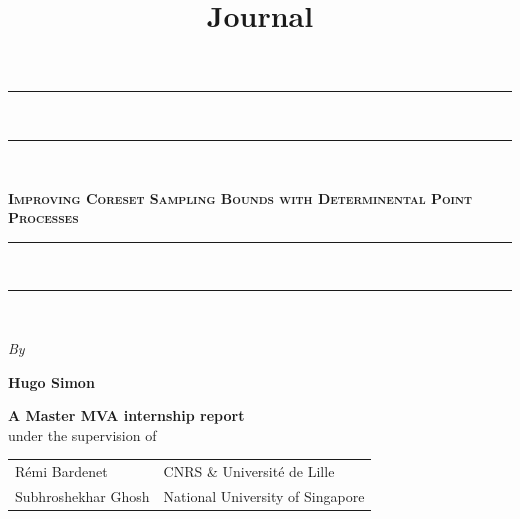 \documentclass{report} %
\title{Journal}
\newcommand{\1}{\mathds{1}} %
\theoremstyle{definition} %
\begin{document}
\begin{titlepage}
    \begin{center}
        \vspace*{25pt} {
        \begin{spacing}{0.05}
            \rule{400pt}{2pt}\\
            \rule{400pt}{0.75pt}\\
        \end{spacing}
        \vspace{20pt}
        \begin{spacing}{0.9}
            \fontsize{26pt}{26pt}\selectfont%
            \textsc{\textbf{Improving Coreset Sampling Bounds with Determinental Point Processes}}\\%
        \end{spacing}
        \vspace{5pt}
        \begin{spacing}{0.05}
            \rule{400pt}{0.75pt}\\
            \rule{400pt}{2pt}\\
        \end{spacing}
        }
    
        \vspace*{1cm}
        \begin{large}
        \textit{By}\\%
        \end{large}
    
    
        \vspace*{4pt}
        \begin{Large}
        \textbf{Hugo Simon}\\%
        \end{Large}
    
    \begin{large}
        \vspace*{5cm}
        \textbf{
        A Master MVA internship report }
        \vspace*{6pt}\\
        under the supervision of
        \vspace*{20pt}\\
    
        \begin{longtable*}{ p{0.4\textwidth} p{0.5\textwidth} }
            R\'emi Bardenet & CNRS \& Université de Lille
            \tabularnewline Subhroshekhar Ghosh & National University of Singapore
            \tabularnewline
        \end{longtable*}
    \end{large}
    

\end{center}
\end{titlepage}
\end{document}
